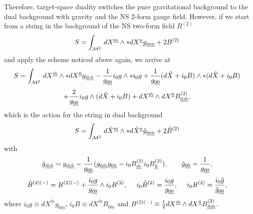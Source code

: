 \documentclass[a4paper,11pt]{article}
\begin{document}
Therefore, target-space duality switches the pure gravitational background to
the dual background with gravity and the NS 2-form gauge field. However, if we 
start from a string in the background of the NS two-form field $B^{(2)}$ 
\begin{equation}\plabel{AB1}
S=\int_{{\cal M}^2}\, dX^{\underline m}\wedge \ast dX^{\underline n}
g_{\underline{mn}}+2B^{(2)}
\end{equation}
and apply the scheme noticed above again, we arrive at
$$
S=\int_{{\cal M}^2}\, dX^{\underline {\tilde m}}\wedge \ast dX^{\underline
{\tilde n}} g_{\underline{\tilde m}\underline{\tilde n}}
-{1\over g_{\underline{00}}}i_0 g\wedge \ast i_0 g
+{1\over g_{\underline{00}}}(d{\hat X}+i_0 B)\wedge \ast (d{\hat X}+i_0 B)
$$
\begin{equation}\plabel{AB2}
+{2\over g_{\underline{00}}}i_0 g\wedge (d{\hat X}+i_0 B)
+dX^{\underline {\tilde m}}\wedge dX^{\underline {\tilde n}}
B^{(2)}_{\underline{\tilde n}\underline{\tilde m}},
\end{equation}
which is the action for the string in dual background
\begin{equation}\plabel{AB2D}
S=\int_{{\cal M}^2}\, d{\tilde X}^{\underline m}\wedge \ast
d{\tilde X}^{\underline n}{\tilde g}_{\underline{mn}}+2{\tilde B}^{(2)}
\end{equation}
with
$$
{\tilde g}_{\underline{\tilde m}\underline{\tilde n}}=
g_{\underline{\tilde m}\underline{\tilde n}}-{1\over g_{\underline{00}}}
(g_{\underline{0}\underline{\tilde m}}g_{\underline{0}\underline{\tilde
n}}-i_0 B^{(2)}_{\underline{\tilde m}} i_0 B^{(2)}_{\underline{\tilde n}})
,\qquad {\tilde g}_{\underline{00}}={1\over g_{\underline{00}}},
$$
\begin{equation}\plabel{TRB}
{\tilde B}^{(2)(-)}=B^{(2)(-)}+{i_0 g\over g_{\underline{00}}}\wedge
i_0 B^{(2)},\ \ \ \
i_0 {\tilde B}^{(2)}={i_0 g\over g_{\underline{00}}},\ \ \ \
i_0 B^{(2)}={i_0 {\tilde g}\over {\tilde g}_{\underline{00}}},
\end{equation}
where $i_0 g\equiv dX^{\underline{\tilde
m}}g_{\underline{0}\underline{\tilde m}}$, $i_0 B\equiv
dX^{\underline{\tilde m}}B_{\underline{0}\underline{\tilde m}}$ and
$B^{(2)(-)}\equiv {1\over 2} dX^{\underline{\tilde m}}\wedge
dX^{\underline{\tilde n}}B^{(2)}_{\underline{\tilde n}\underline{\tilde
m}}$.
\end{document}
